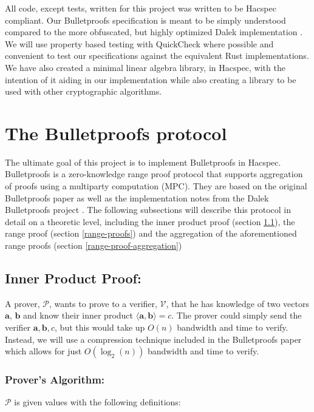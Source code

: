 \documentclass{article}
\renewcommand{\vec}[1]{\boldsymbol{#1}}
\newcommand{\V}{\mathcal{V}}
\renewcommand{\P}{\mathcal{P}}
\newcommand{\dotp}[2]{\langle #1, #2 \rangle}
\begin{document}
All code, except tests, written for this project was written to be
Hacspec compliant. Our Bulletproofs specification is meant to be simply
understood compared to the more obfuscated, but highly optimized Dalek
implementation \cite{dalek}. We will use property based testing with
QuickCheck \cite{quickcheck} where possible and convenient to test
our specifications against the equivalent Rust implementations. We
have also created a minimal linear algebra library, in Hacspec, with
the intention of it aiding in our implementation while also creating
a library to be used with other cryptographic algorithms.

\section{The Bulletproofs protocol} \label{bulletproofs}

The ultimate goal of this project is to implement
Bulletproofs in Hacspec. Bulletproofs is a zero-knowledge range
proof protocol that supports aggregation of proofs using a multiparty
computation (MPC). They are based on the original Bulletproofs paper
\cite{bulletproofs} as well as the implementation notes from the
Dalek Bulletproofs project \cite{dalek-notes}. The following subsections
will describe this protocol in detail on a theoretic level, including 
the inner product proof (section \ref{inner-product-proof}),
the range proof (section \ref{range-proofs}) and the aggregation of the
aforementioned range proofs (section \ref{range-proof-aggregation})

\subsection{Inner Product Proof:} \label{inner-product-proof}
A prover, $\P$, wants to prove to a verifier, $\V$, that he has
knowledge of two vectors $\vec{a}$, $\vec{b}$ and know their inner
product $\dotp{\vec{a}}{\vec{b}} = c$. The prover could simply send
the verifier $\vec{a}, \vec{b}, c$, but this would take up $O(n)$
bandwidth and time to verify. Instead, we will use a compression
technique included in the Bulletproofs paper which allows for just
$O(\log_2(n))$ bandwidth and time to verify.

\subsubsection{Prover's Algorithm:}
$\P$ is given values with the following definitions:
\end{document}

